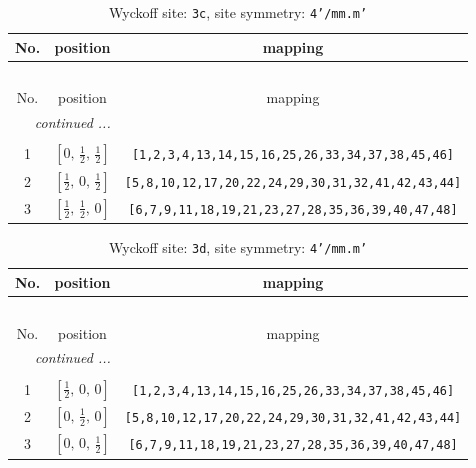 \documentclass[fleqn,8pt]{jsarticle}
\begin{document}
\renewcommand{\arraystretch}{1.2}
\begin{longtable}{ccc}
\caption{Wyckoff site: {\tt 3c}, site symmetry: {\tt 4'/mm.m'}}
 \\
 \hline \hline
No. & position & mapping \\ \hline \endfirsthead

\multicolumn{2}{l}{\tablename\ \thetable{}} \\
 \hline \hline
No. & position & mapping \\ \hline \endhead

 \hline \hline
\multicolumn{2}{r}{\footnotesize\it continued ...} \\ \endfoot

 \hline \hline
\multicolumn{2}{r}{} \\ \endlastfoot

1 & $\left[ 0,\, \frac{1}{2},\, \frac{1}{2} \right]$ & {\tt [1,2,3,4,13,14,15,16,25,26,33,34,37,38,45,46]} \\ \hline
2 & $\left[ \frac{1}{2},\, 0,\, \frac{1}{2} \right]$ & {\tt [5,8,10,12,17,20,22,24,29,30,31,32,41,42,43,44]} \\ \hline
3 & $\left[ \frac{1}{2},\, \frac{1}{2},\, 0 \right]$ & {\tt [6,7,9,11,18,19,21,23,27,28,35,36,39,40,47,48]} \\
\end{longtable}
\renewcommand{\arraystretch}{1.2}
\begin{longtable}{ccc}
\caption{Wyckoff site: {\tt 3d}, site symmetry: {\tt 4'/mm.m'}}
 \\
 \hline \hline
No. & position & mapping \\ \hline \endfirsthead

\multicolumn{2}{l}{\tablename\ \thetable{}} \\
 \hline \hline
No. & position & mapping \\ \hline \endhead

 \hline \hline
\multicolumn{2}{r}{\footnotesize\it continued ...} \\ \endfoot

 \hline \hline
\multicolumn{2}{r}{} \\ \endlastfoot

1 & $\left[ \frac{1}{2},\, 0,\, 0 \right]$ & {\tt [1,2,3,4,13,14,15,16,25,26,33,34,37,38,45,46]} \\ \hline
2 & $\left[ 0,\, \frac{1}{2},\, 0 \right]$ & {\tt [5,8,10,12,17,20,22,24,29,30,31,32,41,42,43,44]} \\ \hline
3 & $\left[ 0,\, 0,\, \frac{1}{2} \right]$ & {\tt [6,7,9,11,18,19,21,23,27,28,35,36,39,40,47,48]} \\
\end{longtable}
\end{document}
